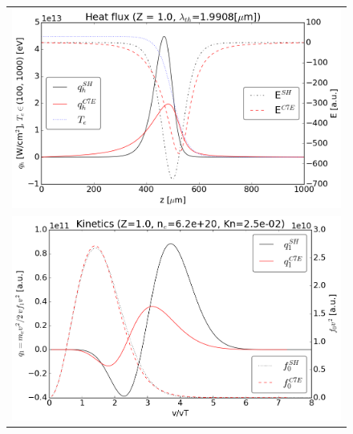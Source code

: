 \documentclass[preprint,12pt]{elsarticle}
\begin{document}
\begin{figure}[tbh]
  \begin{center}
    \begin{tabular}{c}
      \includegraphics[width=1.0\textwidth]{../results/fe_analysis/C7E/P5_heatflux_Z1_halfF.png} \\ 
      \includegraphics[width=1.0\textwidth]{../results/fe_analysis/C7E/P5_kinetics_Z1_halfF.png}
    \end{tabular}
  \caption{
  }
  \end{center}
  \label{fig:AWBScorrection_f1}
\end{figure}
\end{document}
